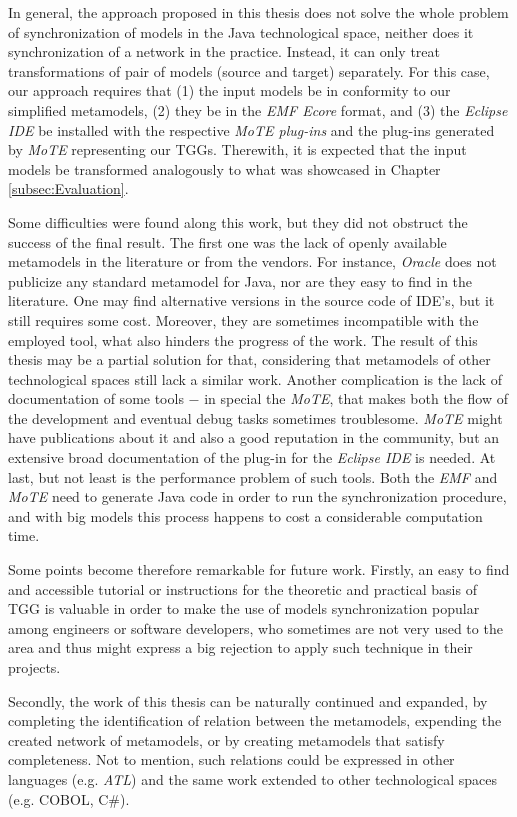 \documentclass[tuberlin,cic,tc,english,noabntcite, oneside]{iiufrgs}
\begin{document}
In general, the approach proposed in this thesis does not solve the whole problem of synchronization of models in the Java technological space, neither does it synchronization of a network in the practice. Instead, it can only treat transformations of pair of models (source and target) separately. For this case, our approach requires that (1) the input models be in conformity to our simplified metamodels, (2) they be in the \emph{EMF Ecore} format, and (3) the \emph{Eclipse IDE} be installed with the respective \emph{MoTE plug-ins} and the plug-ins generated by \emph{MoTE} representing our TGGs. Therewith, it is expected that the input models be transformed analogously to what was showcased in Chapter \ref{subsec:Evaluation}.

Some difficulties were found along this work, but they did not obstruct the success of the final result. The first one was the lack of openly available metamodels in the literature or from the vendors. For instance, \emph{Oracle} does not publicize any standard metamodel for Java, nor are they easy to find in the literature. One may find alternative versions in the source code of IDE's, but it still requires some cost. Moreover, they are sometimes incompatible with the employed tool, what also hinders the progress of the work. The result of this thesis may be a partial solution for that, considering that metamodels of other technological spaces still lack a similar work. Another complication is the lack of documentation of some tools $-$ in special the \emph{MoTE}, that makes both the flow of the development and eventual debug tasks sometimes troublesome. \emph{MoTE} might have publications about it and also a good reputation in the community, but an extensive broad documentation of the plug-in for the \emph{Eclipse IDE} is needed. At last, but not least is the performance problem of such tools. Both the \emph{EMF} and \emph{MoTE} need to generate Java code in order to run the synchronization procedure, and with big models this process happens to cost a considerable computation time.

Some points become therefore remarkable for future work. Firstly, an easy to find and accessible tutorial or instructions for the theoretic and practical basis of TGG is valuable in order to make the use of models synchronization popular among engineers or software developers, who sometimes are not very used to the area and thus might express a big rejection to apply such technique in their projects.

Secondly, the work of this thesis can be naturally continued and expanded, by completing the identification of relation between the metamodels, expending the created network of metamodels, or by creating metamodels that satisfy completeness. Not to mention, such relations could be expressed in other languages (e.g. \emph{ATL}) and the same work extended to other technological spaces (e.g. COBOL, C\#).
\end{document}
